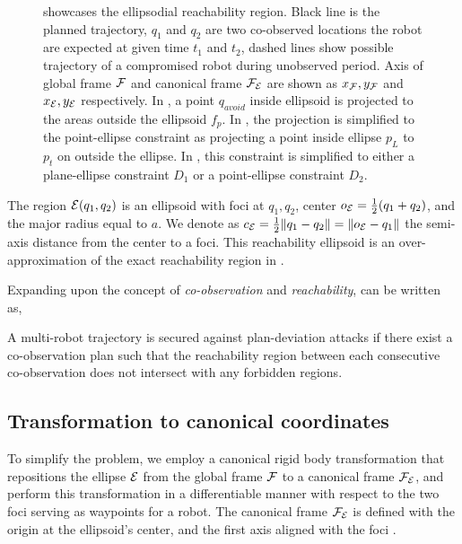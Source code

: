 \documentclass[10pt,twocolumn,twoside]{IEEEtran}
\begin{document}
\begin{figure}
    \caption{  showcases the ellipsodial reachability region. Black line is the planned trajectory, $q_1$ and $q_2$ are two co-observed locations the robot are expected at given time $t_1$ and $t_2$, dashed lines show possible trajectory of a compromised robot during unobserved period. Axis of global frame $\mathcal{F}$ and canonical frame $\mathcal{F}_{\mathcal{E}}$ are shown as $x_{\mathcal{F}}, y_{\mathcal{F}}$ and $x_{\mathcal{E}}, y_{\mathcal{E}}$ respectively. 
    In , a point $q_{avoid}$ inside ellipsoid is projected to the areas outside the ellipsoid $f_{p}$. 
    In , the projection is simplified to the point-ellipse constraint as projecting a point inside ellipse $p_{L}$ to $p_{t}$ on outside the ellipse.
    In , this constraint is simplified to either a plane-ellipse constraint $D_{1}$ or a point-ellipse constraint $D_{2}$.}
    \label{fig:Reachability_full}
  \end{figure}

The region $\mathcal{E}(q_1,q_2)$ is an ellipsoid with foci at $q_1,q_2$, center $o_{\mathcal{E}} = \frac{1}{2}(q_1+q_2)$, and the major radius equal to $a$. We denote as $c_{\mathcal{E}}=\frac{1}{2}\lVert q_1-q_2\rVert=\lVert o_{\mathcal{E}}-q_1\rVert$ the semi-axis distance from the center to a foci. This reachability ellipsoid is an over-approximation of the exact reachability region in  .

Expanding upon the concept of \emph{co-observation} and \emph{reachability},  can be written as,
\begin{remark}\label{rmk:revised-security}
  A multi-robot trajectory is secured against plan-deviation attacks if there exist a co-observation plan such that the reachability region between each consecutive co-observation does not intersect with any forbidden regions.
\end{remark}

\subsection{Transformation to canonical coordinates}\label{sec:rotation2Standard}
To simplify the problem, we employ a canonical rigid body transformation that repositions the ellipse $\mathcal{E}$ from the global frame $\mathcal{F}$ to a canonical frame $\mathcal{F}_{\mathcal{E}}$, and perform this transformation in a differentiable manner with respect to the two foci serving as waypoints for a robot. The canonical frame $\mathcal{F}_{\mathcal{E}}$ is defined with the origin at the ellipsoid's center, and the first axis aligned with the foci . 
\end{document}
